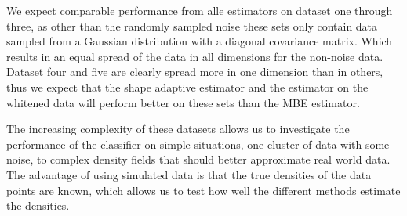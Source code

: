 We expect comparable performance from alle estimators on dataset one through three, as other than the randomly sampled noise these sets only contain data sampled from a Gaussian distribution with a diagonal covariance matrix. Which results in an equal spread of the data in all dimensions for the non-noise data. Dataset four and five are clearly spread more in one dimension than in others, thus we expect that the shape adaptive estimator and the estimator on the whitened data will perform better on these sets than the MBE estimator.

The increasing complexity of these datasets allows us to investigate the performance of the classifier on simple situations, one cluster of data with some noise, to complex density fields that should better approximate real world data. The advantage of using simulated data is that the true densities of the data points are known, which allows us to test how well the different methods estimate the densities.